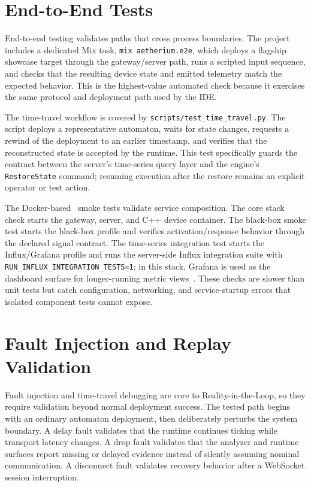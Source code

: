 \section{End-to-End Tests}

End-to-end testing validates paths that cross process boundaries. The project includes a dedicated Mix task, \texttt{mix aetherium.e2e}, which deploys a flagship showcase target through the gateway/server path, runs a scripted input sequence, and checks that the resulting device state and emitted telemetry match the expected behavior. This is the highest-value automated check because it exercises the same protocol and deployment path used by the IDE.

The time-travel workflow is covered by \texttt{scripts/test\_time\_travel.py}. The script deploys a representative automaton, waits for state changes, requests a rewind of the deployment to an earlier timestamp, and verifies that the reconstructed state is accepted by the runtime. This test specifically guards the contract between the server's time-series query layer and the engine's \texttt{RestoreState} command; resuming execution after the restore remains an explicit operator or test action.

The Docker-based~\cite{Docker} smoke tests validate service composition. The core stack check starts the gateway, server, and C++ device container. The black-box smoke test starts the black-box profile and verifies activation/response behavior through the declared signal contract. The time-series integration test starts the Influx/Grafana profile and runs the server-side Influx integration suite with \texttt{RUN\_INFLUX\_INTEGRATION\_TESTS=1}; in this stack, Grafana is used as the dashboard surface for longer-running metric views~\cite{GrafanaDashboards}. These checks are slower than unit tests but catch configuration, networking, and service-startup errors that isolated component tests cannot expose.

\section{Fault Injection and Replay Validation}

Fault injection and time-travel debugging are core to Reality-in-the-Loop, so they require validation beyond normal deployment success. The tested path begins with an ordinary automaton deployment, then deliberately perturbs the system boundary. A delay fault validates that the runtime continues ticking while transport latency changes. A drop fault validates that the analyzer and runtime surfaces report missing or delayed evidence instead of silently assuming nominal communication. A disconnect fault validates recovery behavior after a WebSocket session interruption.

